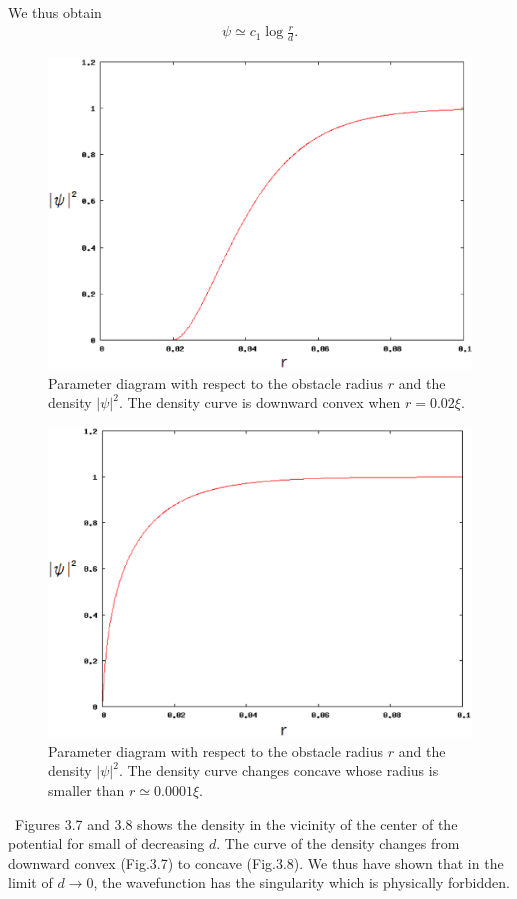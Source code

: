 \documentclass[12pt,a4paper]{report}
\begin{document}
We thus obtain
\begin{eqnarray}
\psi \simeq c_1 \log \frac{r}{d}.
\end{eqnarray}
\begin{figure}[htbp]\begin{center}
\includegraphics[scale=0.45,keepaspectratio]{3-7.eps}
\caption{
Parameter diagram with respect to the obstacle radius $r$ and the density $|\psi|^2$.
The density curve is downward convex when $r = 0.02 \xi$.
}
\label{FIG:3-7}
\end{center}\end{figure}
\begin{figure}[htbp]\begin{center}
\includegraphics[scale=0.45,keepaspectratio]{3-8.eps}
\caption{
Parameter diagram with respect to the obstacle radius $r$ and the density $|\psi|^2$.
The density curve changes concave whose radius is smaller than $r \simeq 0.0001 \xi$.
}
\label{FIG:3-8}
\end{center}\end{figure}
\ Figures 3.7 and 3.8 shows the density in the vicinity of the center of the potential
for small of decreasing $d$. The curve of the density changes from downward convex (Fig.3.7) to concave (Fig.3.8).
We thus have shown that in the limit of $d \rightarrow 0$,
the wavefunction has the singularity which is physically forbidden.
\newpage
\end{document}
